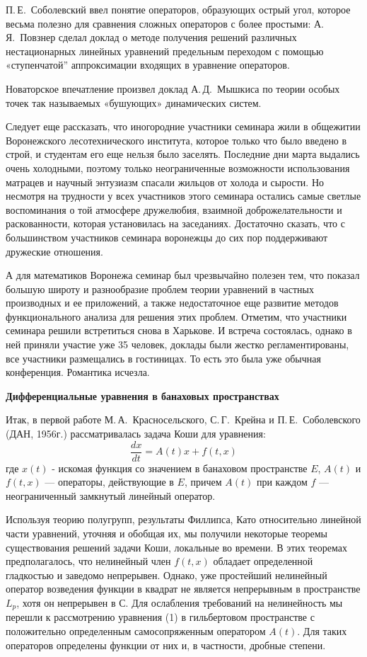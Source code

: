 П.\,Е.~Соболевский ввел понятие операторов, образующих острый угол,  которое весьма полезно для сравнения сложных операторов с более простыми: А.\,Я.~Повзнер сделал доклад о методе получения решений различных нестационарных линейных уравнений предельным переходом с помощью «ступенчатой”  аппроксимации входящих в уравнение операторов.

Новаторское впечатление произвел доклад А.\,Д.~Мышкиса по теории особых точек так называемых «бушующих» динамических систем.

 	Следует еще рассказать, что иногородние участники семинара жили в общежитии Воронежского лесотехнического института, которое только что было введено в строй, и студентам его еще нельзя было заселять. Последние дни марта выдались очень холодными, поэтому только неограниченные возможности использования матрацев и научный энтузиазм спасали жильцов от холода и сырости. Но несмотря на трудности у всех участников этого семинара остались самые светлые воспоминания о той атмосфере дружелюбия, взаимной доброжелательности и раскованности, которая установилась на заседаниях. Достаточно сказать, что с большинством участников семинара воронежцы до сих пор поддерживают дружеские отношения.

А для математиков Воронежа семинар был чрезвычайно полезен тем, что показал большую широту и разнообразие проблем теории уравнений в       частных производных и ее приложений, а также недостаточное еще развитие методов функционального анализа для решения этих проблем.
Отметим, что участники семинара решили встретиться снова в Харькове. И встреча состоялась, однако в ней приняли участие уже 35 человек, доклады были жестко регламентированы, все участники размещались в гостиницах. То есть это была уже обычная конференция. Романтика исчезла.

{\bf Дифференциальные уравнения в банаховых пространствах}

Итак, в первой работе М.\,А.~Красносельского, С.\,Г.~Крейна и П.\,Е.~Соболевского (ДАН, 1956г.) рассматривалась задача Коши для уравнения:
\begin{equation}
\frac{dx}{dt} = A(t)x + f(t, x)
\end{equation}
где $x(t)$ - искомая функция со значением в банаховом пространстве $E$, $A(t)$ и $f(t,x)$ --- операторы, действующие в $E$, причем $A(t)$ при каждом $f$ --- неограниченный замкнутый линейный оператор.

Используя теорию полугрупп, результаты Филлипса, Като относительно линейной части уравнений, уточняя и обобщая их, мы получили некоторые теоремы существования решений задачи Коши, локальные во времени. В этих теоремах предполагалось, что нелинейный член $f(t,x)$ обладает определенной гладкостью и заведомо непрерывен. Однако, уже простейший нелинейный оператор возведения функции в квадрат не является непрерывным в пространстве $L_p$, хотя он непрерывен в С. Для ослабления требований на нелинейность мы перешли к рассмотрению уравнения (1) в гильбертовом пространстве с положительно определенным самосопряженным оператором $A(t)$. Для таких операторов определены функции от них и, в частности, дробные степени.

